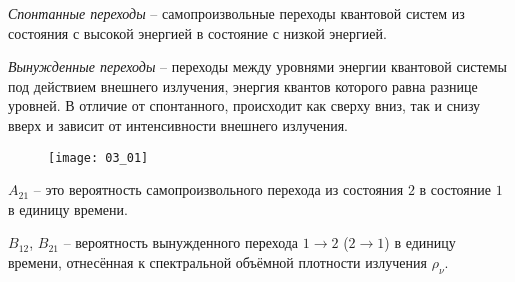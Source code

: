 

\emph{Спонтанные переходы} -- самопроизвольные переходы квантовой систем 
из состояния с высокой энергией в состояние с низкой энергией.

\emph{Вынужденные переходы} -- переходы между уровнями энергии квантовой 
системы под действием внешнего излучения, энергия квантов которого равна 
разнице уровней. В отличие от спонтанного, происходит как сверху вниз, так 
и снизу вверх и зависит от интенсивности внешнего излучения.


\begin{figure}[h!]
	\center
	\texttt{[image: 03\_01]}
\end{figure}

\( A_{21} \) -- это вероятность самопроизвольного перехода из состояния 
\( 2 \) в состояние \( 1 \) в единицу времени. 

\( B_{12} \), \( B_{21} \) -- вероятность вынужденного перехода 
\( 1 \rightarrow 2 \) (\( 2 \rightarrow 1 \)) в единицу времени, отнесённая к 
спектральной объёмной плотности излучения \( \rho_\nu \).
